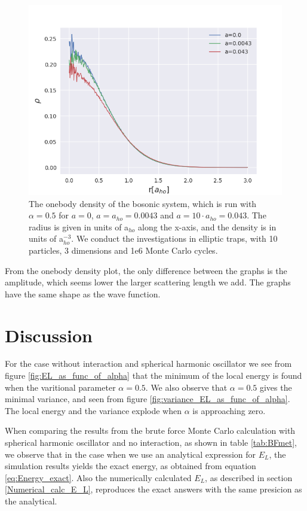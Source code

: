 \documentclass[norsk,a4paper,12pt]{article}
\begin{document}
\begin{figure} [H]
    \centering
    \includegraphics[scale=0.80]{images/ob.png}
    \caption{The onebody density of the bosonic system, which is run with $\alpha=0.5$ for $a=0$, $a=a_{ho}=0.0043$ and $a=10\cdot a_{ho}=0.043$. The radius is given in units of a$_{ho}$ along the x-axis, and the density is in units of a$_{ho}^{-3}$. We conduct the investigations in elliptic traps, with 10 particles, 3 dimensions and 1e6 Monte Carlo cycles. }
    \label{fig:ob0}
\end{figure}

From the onebody density plot, the only difference between the graphs is the amplitude, which seems lower the larger scattering length we add. The graphs have the same shape as the wave function. 

\section{Discussion} \label{Discussion}
For the case without interaction and spherical harmonic oscillator we see from figure \ref{fig:EL_as_func_of_alpha} that the minimum of the local energy is found when the varitional parameter $\alpha=0.5$. We also observe that $\alpha=0.5$ gives the minimal variance, and seen from figure \ref{fig:variance_EL_as_func_of_alpha}. The local energy and the variance explode when $\alpha$ is approaching zero.  
\par 
\vspace{3mm}

When comparing the results from the brute force Monte Carlo calculation with spherical harmonic oscillator and no interaction, as shown in table \ref{tab:BFmet}, we observe that in the case when we use an analytical expression for $E_L$, the simulation results yields the exact energy, as obtained from equation \ref{eq:Energy_exact}. Also the numerically calculated $E_L$, as described in section \ref{Numerical_calc_E_L}, reproduces the exact answers with the same presicion as the analytical. 
\end{document}
